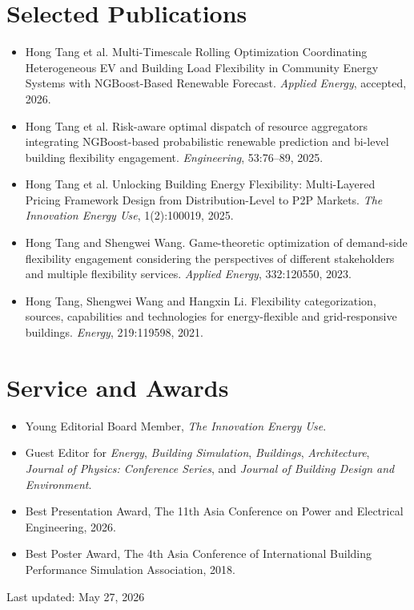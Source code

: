 \documentclass[11pt,a4paper]{article}
\begin{document}
\section*{Selected Publications}
\begin{itemize}
\item Hong Tang et al. Multi-Timescale Rolling Optimization Coordinating Heterogeneous EV and Building Load Flexibility in Community Energy Systems with NGBoost-Based Renewable Forecast. \emph{Applied Energy}, accepted, 2026.
\item Hong Tang et al. Risk-aware optimal dispatch of resource aggregators integrating NGBoost-based probabilistic renewable prediction and bi-level building flexibility engagement. \emph{Engineering}, 53:76--89, 2025.
\item Hong Tang et al. Unlocking Building Energy Flexibility: Multi-Layered Pricing Framework Design from Distribution-Level to P2P Markets. \emph{The Innovation Energy Use}, 1(2):100019, 2025.
\item Hong Tang and Shengwei Wang. Game-theoretic optimization of demand-side flexibility engagement considering the perspectives of different stakeholders and multiple flexibility services. \emph{Applied Energy}, 332:120550, 2023.
\item Hong Tang, Shengwei Wang and Hangxin Li. Flexibility categorization, sources, capabilities and technologies for energy-flexible and grid-responsive buildings. \emph{Energy}, 219:119598, 2021.
\end{itemize}

\section*{Service and Awards}
\begin{itemize}
\item Young Editorial Board Member, \emph{The Innovation Energy Use}.
\item Guest Editor for \emph{Energy}, \emph{Building Simulation}, \emph{Buildings}, \emph{Architecture}, \emph{Journal of Physics: Conference Series}, and \emph{Journal of Building Design and Environment}.
\item Best Presentation Award, The 11th Asia Conference on Power and Electrical Engineering, 2026.
\item Best Poster Award, The 4th Asia Conference of International Building Performance Simulation Association, 2018.
\end{itemize}

\vfill
\noindent Last updated: May 27, 2026
\end{document}
